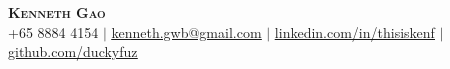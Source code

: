 \documentclass[letterpaper,11pt]{article}
\begin{document}

\begin{center}
    \textbf{\Huge \scshape Kenneth Gao} \\ \vspace{1pt}
    \small +65 8884 4154 $|$ \href{mailto:kenneth.gwb@gmail.com}{\underline{kenneth.gwb@gmail.com}} $|$ 
    \href{https://linkedin.com/in/thisiskenf/}{\underline{linkedin.com/in/thisiskenf}} $|$
    \href{https://github.com/duckyfuz/}{\underline{github.com/duckyfuz}}
\end{center}

\end{document}
